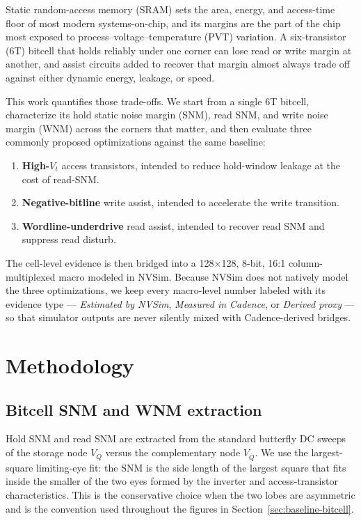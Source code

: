 \documentclass[pdflatex,sn-mathphys-num,iicol]{sn-jnl}%
\theoremstyle{thmstyleone}%
\theoremstyle{thmstyletwo}%
\theoremstyle{thmstylethree}%
\begin{document}
Static random-access memory (SRAM) sets the area, energy, and access-time floor of most modern systems-on-chip, and its margins are the part of the chip most exposed to process--voltage--temperature (PVT) variation. A six-transistor (6T) bitcell that holds reliably under one corner can lose read or write margin at another, and assist circuits added to recover that margin almost always trade off against either dynamic energy, leakage, or speed.

This work quantifies those trade-offs. We start from a single 6T bitcell, characterize its hold static noise margin (SNM), read SNM, and write noise margin (WNM) across the corners that matter, and then evaluate three commonly proposed optimizations against the same baseline:

\begin{enumerate}
    \item \textbf{High-$V_t$} access transistors, intended to reduce hold-window leakage at the cost of read-SNM.
    \item \textbf{Negative-bitline} write assist, intended to accelerate the write transition.
    \item \textbf{Wordline-underdrive} read assist, intended to recover read SNM and suppress read disturb.
\end{enumerate}

The cell-level evidence is then bridged into a 128$\times$128, 8-bit, 16:1 column-multiplexed macro modeled in NVSim. Because NVSim does not natively model the three optimizations, we keep every macro-level number labeled with its evidence type --- \emph{Estimated by NVSim}, \emph{Measured in Cadence}, or \emph{Derived proxy} --- so that simulator outputs are never silently mixed with Cadence-derived bridges.

\section{Methodology}\label{sec:methodology}

\subsection{Bitcell SNM and WNM extraction}\label{sec:methodology-bitcell}

Hold SNM and read SNM are extracted from the standard butterfly DC sweeps of the storage node $V_Q$ versus the complementary node $V_{\overline{Q}}$. We use the largest-square limiting-eye fit: the SNM is the side length of the largest square that fits inside the smaller of the two eyes formed by the inverter and access-transistor characteristics. This is the conservative choice when the two lobes are asymmetric and is the convention used throughout the figures in Section~\ref{sec:baseline-bitcell}.
\end{document}
